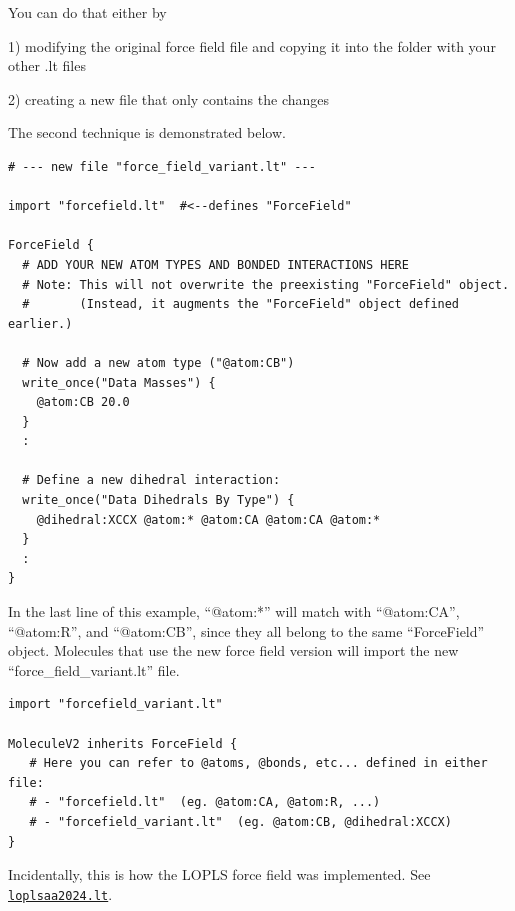 \documentclass[11pt]{article}
\begin{document}
You can do that either by

\begin{list}{}
\item 1) modifying the original force field file and copying it into the folder with your other .lt files
\item 2) creating a new file that only contains the changes
\end{list}

The second technique is demonstrated below.

\begin{verbatim}
# --- new file "force_field_variant.lt" ---

import "forcefield.lt"  #<--defines "ForceField"

ForceField {
  # ADD YOUR NEW ATOM TYPES AND BONDED INTERACTIONS HERE
  # Note: This will not overwrite the preexisting "ForceField" object.
  #       (Instead, it augments the "ForceField" object defined earlier.)

  # Now add a new atom type ("@atom:CB")
  write_once("Data Masses") {
    @atom:CB 20.0
  }
  :

  # Define a new dihedral interaction:
  write_once("Data Dihedrals By Type") {
    @dihedral:XCCX @atom:* @atom:CA @atom:CA @atom:*
  }
  :
}
\end{verbatim}
In the last line of this example, ``@atom:*'' will match with
``@atom:CA'', ``@atom:R'', and ``@atom:CB'',
since they all belong to the same ``\mbox{ForceField}'' object.
Molecules that use the new force field version will
import the new ``force\_field\_variant.lt'' file.

\begin{verbatim}
import "forcefield_variant.lt"

MoleculeV2 inherits ForceField {
   # Here you can refer to @atoms, @bonds, etc... defined in either file:
   # - "forcefield.lt"  (eg. @atom:CA, @atom:R, ...)
   # - "forcefield_variant.lt"  (eg. @atom:CB, @dihedral:XCCX)
}
\end{verbatim}

Incidentally, this is how the LOPLS force field was implemented.
See \href{https://github.com/jewettaij/moltemplate/blob/master/moltemplate/force_fields/loplsaa2024.lt}{\tt loplsaa2024.lt}.
\end{document}
